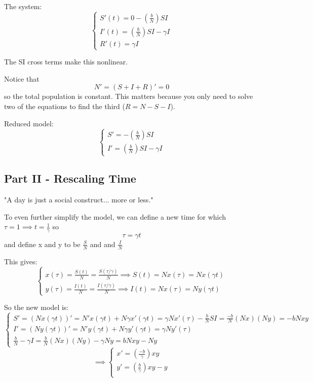 \documentclass[12pt]{article}
\begin{document}
The system:
\[\begin{cases}
    S'(t) = 0 - \left(\frac{b}{N}\right) SI\\
    I'(t) = \left(\frac{b}{N}\right) SI - \gamma I\\
    R'(t) = \gamma I
\end{cases}\]

The SI cross terms make this nonlinear. 

Notice that 
\[N' = (S + I + R)' = 0\]
so the total population is constant. This matters because you only need to solve two of the equations to find the third ($R = N - S - I$). 

Reduced model:
\[\begin{cases}
    S' = -\left(\frac{b}{N}\right) SI\\
    I' = \left(\frac{b}{N}\right) SI - \gamma I
\end{cases}\]

\subsection*{Part II - Rescaling Time}
"A day is just a social construct... more or less."

To even further simplify the model, we can define a new time for which $\tau = 1 \implies t = \frac{1}{\gamma}$ so 
\[\tau = \gamma t\]
and define x and y to be $\frac{S}{N}$ and and $\frac{I}{N}$

This gives:
\[\begin{cases}
    x(\tau) = \frac{S(t)}{N} = \frac{S(\tau / \gamma)}{N} \implies S(t) = Nx(\tau) = Nx(\gamma t)\\
    y(\tau) = \frac{I(t)}{N} = \frac{I(\tau / \gamma)}{N} \implies I(t) = Nx(\tau) =  Ny(\gamma t)
\end{cases}\]

So the new model is:
\[\begin{cases}
    S' = (Nx(\gamma t))' = N' x(\gamma t) + N\gamma x'(\gamma t) = \gamma N x'(\tau)
    -\frac{b}{N} SI = \frac{-b}{N}(Nx)(Ny) = -bNxy\\
    I' = (Ny(\gamma t))' = N' y(\gamma t) + N\gamma y'(\gamma t) = \gamma N y'(\tau)\\
    \frac{b}{N} - \gamma I = \frac{b}{N}(Nx)(Ny) - \gamma Ny = bNxy - Ny
\end{cases}\]
\[\implies \begin{cases}
    x' = \left(\frac{-b}{\gamma}\right)xy\\
    y' = \left(\frac{b}{\gamma}\right)xy - y\\
\end{cases}\]
\end{document}
